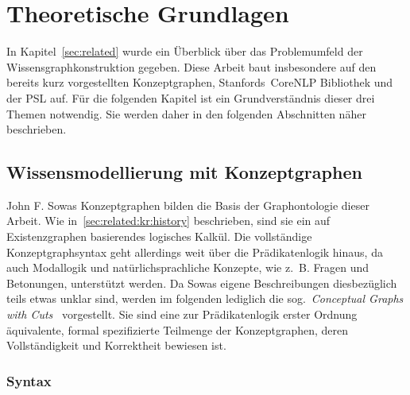 \chapter{Theoretische Grundlagen}%
\label{sec:theory}

In Kapitel~\ref{sec:related} wurde ein Überblick über das Problemumfeld der Wissensgraphkonstruktion gegeben.
Diese Arbeit baut insbesondere auf den bereits kurz vorgestellten Konzeptgraphen, Stanfords~CoreNLP Bibliothek und der PSL auf.
Für die folgenden Kapitel ist ein Grundverständnis dieser drei Themen notwendig.
Sie werden daher in den folgenden Abschnitten näher beschrieben.

\section{Wissensmodellierung mit Konzeptgraphen}%
\label{sec:theory:cg}

John F. Sowas Konzeptgraphen bilden die Basis der Graphontologie dieser Arbeit.
Wie in~\ref{sec:related:kr:history} beschrieben, sind sie ein auf Existenzgraphen basierendes logisches Kalkül.
Die vollständige Konzeptgraphsyntax geht allerdings weit über die Prädikatenlogik hinaus, da auch Modallogik und natürlichsprachliche Konzepte, wie z.~B. Fragen und Betonungen, unterstützt werden.
Da Sowas eigene Beschreibungen diesbezüglich teils etwas unklar sind, werden im folgenden lediglich die sog.~\textit{Conceptual Graphs with Cuts}~\cite{Dau2003} vorgestellt.
Sie sind eine zur Prädikatenlogik erster Ordnung äquivalente, formal spezifizierte Teilmenge der Konzeptgraphen, deren Vollständigkeit und Korrektheit bewiesen ist.

\subsection{Syntax}%
\label{sec:theory:cg:syntax}

